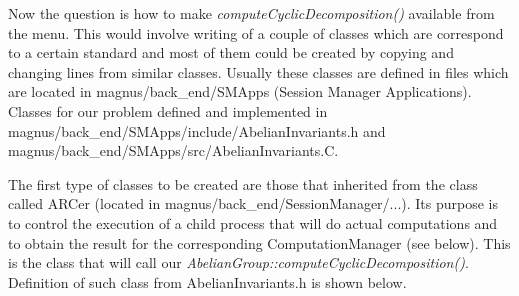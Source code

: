 \documentclass[12pt]{article}
\begin{document}
          Now the question is how to make  \emph{computeCyclicDecomposition()}  
  available from
   the menu. This would involve writing of a couple of classes which are 
  correspond to a
   certain standard and most of them could be created by copying and changing 
   lines from similar classes.
   Usually these classes are  defined in files which are located in 
  magnus/back\_end/SMApps
   (Session Manager Applications). Classes for our problem defined and implemented 
  in
   magnus/back\_end/SMApps/include/AbelianInvariants.h and 
  magnus/back\_end/SMApps/src/AbelianInvariants.C.

          The first type of classes to be created are those that inherited from 
  the class
   called ARCer (located in magnus/back\_end/SessionManager/...). Its purpose is 
  to control
   the execution of a child process that will do actual computations and to obtain 
  the
   result for the corresponding ComputationManager (see below). 
  This is the class that will call our
   \emph{AbelianGroup::computeCyclicDecomposition()}.  Definition of such class 
  from
  AbelianInvariants.h is shown below. 
  
\end{document}
